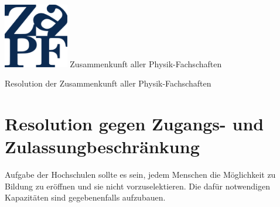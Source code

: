 \documentclass[DIV=calc]{scrartcl}
\begin{document}
\hspace{0.87\textwidth}
\begin{minipage}{120pt}
\vspace{-1.8cm}
\includegraphics[width=80pt]{logo.pdf}
\centering
\small Zusammenkunft aller Physik-Fachschaften
\end{minipage}
\begin{center}
\huge{Resolution der Zusammenkunft aller Physik-Fachschaften} \\
\normalsize
\end{center}

\vspace{1cm}
\section*{Resolution gegen Zugangs- und Zulassungbeschränkung}

Aufgabe der Hochschulen sollte es sein, jedem Menschen die Möglichkeit zu Bildung zu eröffnen und sie nicht vorzuselektieren. Die dafür notwendigen Kapazitäten sind gegebenenfalls aufzubauen. 
\end{document}
